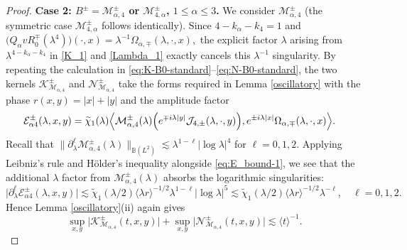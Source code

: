\documentclass[10pt,a4paper]{amsart}
\begin{document}
\begin{proof}
	

	\textbf{Case 2: $B^\pm=\mathcal{M}_{\alpha,4}^\pm$ or
		$\mathcal{M}_{4,\alpha}^\pm$, $1\leq\alpha\leq3$.}
	We consider $\mathcal{M}_{\alpha,4}^\pm$ (the symmetric case $\mathcal{M}_{4,\alpha}^{\pm}$ follows identically). Since
	$
	4-k_\alpha-k_4=1
	$
	and
	$
	\bigl(
	Q_\alpha vR_0^\mp(\lambda^4)
	\bigr)(\cdot,x)
	=
	\lambda^{-1}
	\Omega_{\alpha,\mp}(\lambda,\cdot,x),
	$
	the explicit factor $\lambda$ arising from
	$\lambda^{4-k_\alpha-k_4}$  in
	\eqref{K_1} and \eqref{Lambda_1} exactly cancels this
	$\lambda^{-1}$ singularity. By repeating the calculation in
	\eqref{eq:K-B0-standard}--\eqref{eq:N-B0-standard}, the two kernels $	\mathcal{K}_{\mathcal{M}_{\alpha,4}}^\pm$ and $	\mathcal{N}_{\mathcal{M}_{\alpha,4}}^\pm$ 
	take the forms required in Lemma \ref{oscillatory} with the  phase
	$
	r(x,y)=|x|+|y|
	$
	and the  amplitude factor
	\begin{align*}
		\mathcal{E}_{\alpha4}^\pm(\lambda,x,y)
		={}&
		\widetilde{\chi}_1(\lambda)
		\Bigl\langle
		\mathcal{M}_{\alpha,4}^\pm(\lambda)
		\Bigl(
		e^{\mp i\lambda|y|}
		\mathcal{J}_{4,\pm}(\lambda,\cdot,y)
		\Bigr),
		e^{\pm i\lambda|x|}
		\Omega_{\alpha,\mp}(\lambda,\cdot,x)
		\Bigr\rangle.
	\end{align*}
	Recall that
$
\|\partial_\lambda^\ell \mathcal{M}_{\alpha, 4}^{\pm}(\lambda)\|_{\mathbb{B}(L^2)} \lesssim \lambda^{1-\ell}|\log\lambda|^{4}$ for   $\ell=0,1,2.$ 
Applying Leibniz's rule and H\"older's inequality alongside \eqref{eq:E_bound-1}, we see that the additional $\lambda$ factor from $ \mathcal{M}_{\alpha, 4}^{\pm}(\lambda)$ absorbs the logarithmic singularities:
\[  
\bigl| \partial_\lambda^{\ell} \mathcal{E}_{\alpha4}^\pm(\lambda,x,y) \bigr| \lesssim \widetilde{\chi}_1(\lambda/2) \langle \lambda r \rangle^{-1/2} \lambda^{1-\ell}|\log\lambda|^5 \lesssim \widetilde{\chi}_1(\lambda/2) \langle \lambda r \rangle^{-1/2} \lambda^{-\ell}, \quad \ell = 0,1,2. 
\]   
	Hence Lemma \ref{oscillatory}(ii) again gives
	$$
	\sup_{x,y}
	\bigl|
	\mathcal{K}_{\mathcal{M}_{\alpha,4}}^\pm(t,x,y)
	\bigr|
	+
	\sup_{x,y}
	\bigl|
	\mathcal{N}_{\mathcal{M}_{\alpha,4}}^\pm(t,x,y)
	\bigr|
	\lesssim
	\langle t\rangle^{-1}.
	$$
	

\end{proof}
\end{document}
